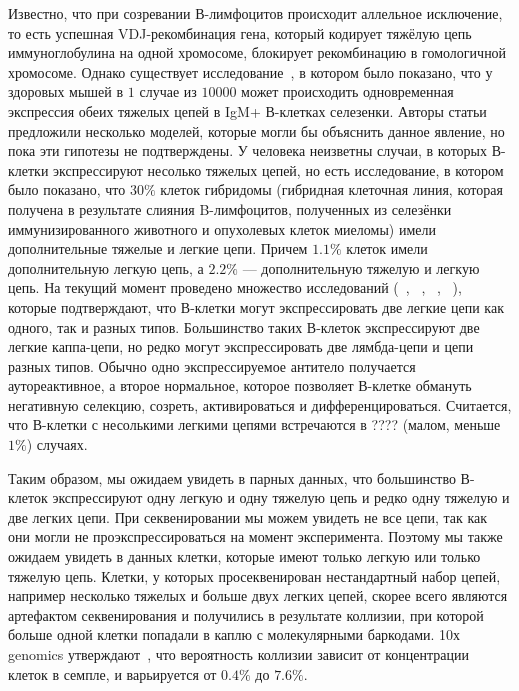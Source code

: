 \documentclass{spbau-diploma}
\begin{document}
Известно, что при созревании В-лимфоцитов происходит аллельное исключение, то есть успешная VDJ-рекомбинация гена, который кодирует тяжёлую цепь иммуноглобулина на одной хромосоме, блокирует  рекомбинацию в гомологичной хромосоме. Однако существует исследование~\cite{barreto2000frequency}, в котором было показано, что у здоровых мышей в $1$ случае из $10000$ может происходить одновременная экспрессия обеих тяжелых цепей в IgM+ В-клетках селезенки. Авторы статьи предложили несколько моделей, которые могли бы объяснить данное явление, но пока эти гипотезы не подтверждены. У человека неизветны случаи, в которых В-клетки экспрессируют несолько тяжелых цепей, но есть исследование, в котором было показано, что $30\%$ клеток гибридомы (гибридная клеточная линия, которая получена в результате слияния B-лимфоцитов, полученных из селезёнки иммунизированного животного и опухолевых клеток миеломы) имели дополнительные тяжелые и легкие цепи. Причем  $1.1\%$ клеток имели дополнительную легкую цепь, а $2.2\%$ --- дополнительную тяжелую и легкую цепь. На текущий момент проведено множество исследований (~\cite{pelanda2014dual}, ~\cite{casellas2007igkappa}, ~\cite{liu2005receptor}, ~\cite{fraser2015immunoglobulin}), которые подтверждают, что В-клетки могут экспрессировать две легкие цепи как одного, так и разных типов. Большинство таких В-клеток экспрессируют две легкие каппа-цепи, но редко могут экспрессировать две лямбда-цепи и цепи разных типов. Обычно одно экспрессируемое антитело получается аутореактивное, а второе нормальное, которое позволяет В-клетке обмануть негативную селекцию, созреть, активироваться и дифференцироваться. Считается, что В-клетки  с несолькими легкими цепями встречаются в ???? (малом, меньше $1\%$) случаях.     

Таким образом, мы ожидаем увидеть в парных данных, что большинство В-клеток экспрессируют одну легкую и одну тяжелую цепь и редко одну тяжелую и две легких цепи. При секвенировании мы можем увидеть не все цепи, так как они могли не проэкспрессироваться на момент эксперимента. Поэтому мы также ожидаем увидеть в данных клетки, которые имеют только легкую или только тяжелую цепь. Клетки, у которых просеквенирован нестандартный набор цепей, например несколько тяжелых и больше двух легких цепей, скорее всего являются артефактом секвенирования и получились в результате коллизии, при которой больше одной клетки попадали в каплю с молекулярными баркодами. 10х genomics утверждают~\cite{10x_manual}, что вероятность коллизии зависит от концентрации клеток в семпле, и варьируется от $0.4\%$ до $7.6\%$.
\end{document}
